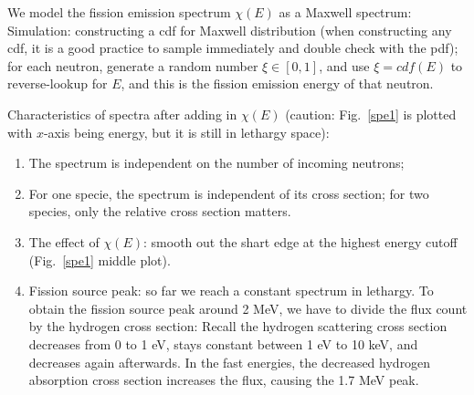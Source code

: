 \documentclass{school-22.211-notes}
\begin{document}
\clearpage
{}
We model the fission emission spectrum $\chi(E)$ as a Maxwell spectrum:
Simulation: constructing a cdf for Maxwell distribution (when constructing any cdf, it is a good practice to sample immediately and double check with the pdf); for each neutron, generate a random number $\xi \in [0,1]$, and use $\xi = cdf(E)$ to reverse-lookup for $E$, and this is the fission emission energy of that neutron. 

Characteristics of spectra after adding in $\chi(E)$ (caution: Fig.~\ref{spe1} is plotted with $x$-axis being energy, but it is still in lethargy space): 
\begin{enumerate}
\item The spectrum is independent on the number of incoming neutrons; 

\item For one specie, the spectrum is independent of its cross section; for two species, only the relative cross section matters. 

\item The effect of $\chi(E)$: smooth out the shart edge at the highest energy cutoff (Fig.~\ref{spe1} middle plot).

\item Fission source peak: so far we reach a constant spectrum in lethargy. To obtain the fission source peak around 2 MeV, we have to divide the flux count by the hydrogen cross section:
  Recall the hydrogen scattering cross section decreases from 0 to 1 eV, stays constant between 1 eV to 10 keV, and decreases again afterwards. In the fast energies, the decreased hydrogen absorption cross section increases the flux, causing the 1.7 MeV peak. 
\end{enumerate}
\end{document}
